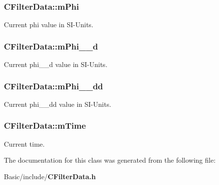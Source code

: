\subsubsection[{m\-Phi}]{ C\-Filter\-Data\-::m\-Phi\hspace{0.3cm}{\ttfamily [private]}}\label{classCFilterData_aab61e32e12b026660260eee593363875}


Current phi value in S\-I-\/\-Units. 

\subsubsection[{m\-Phi\-\_\-\-\_\-d}]{ C\-Filter\-Data\-::m\-Phi\-\_\-\-\_\-d\hspace{0.3cm}{\ttfamily [private]}}\label{classCFilterData_ae7e38dd790570bf7a9463d8a2af0297a}


Current phi\-\_\-\-\_\-d value in S\-I-\/\-Units. 

\subsubsection[{m\-Phi\-\_\-\-\_\-dd}]{ C\-Filter\-Data\-::m\-Phi\-\_\-\-\_\-dd\hspace{0.3cm}{\ttfamily [private]}}\label{classCFilterData_a52b54ca1aa241f4868b2fc27ef0b0453}


Current phi\-\_\-\-\_\-dd value in S\-I-\/\-Units. 

\subsubsection[{m\-Time}]{ C\-Filter\-Data\-::m\-Time\hspace{0.3cm}{\ttfamily [private]}}\label{classCFilterData_aa43b91fecb4151f182cf7b566589b178}


Current time. 



The documentation for this class was generated from the following file\-:\begin{DoxyCompactItemize}
\item 
Basic/include/{\bf C\-Filter\-Data.\-h}\end{DoxyCompactItemize}
